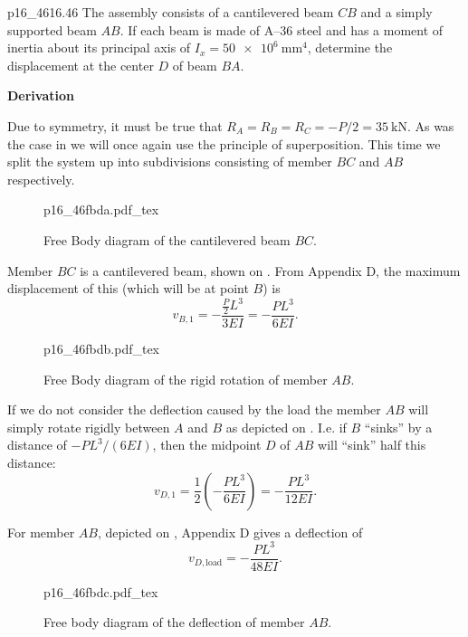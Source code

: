 \documentclass[a4paper]{article}
\newcommand{\incfig}[2][1]{%
  \def\svgwidth{#1\columnwidth}
  {#2.pdf_tex}
}
\newcounter{problem}
\numberwithin{equation}{problem}
\newcommand{\AUheading}[1]{%
  \par\vspace{.4\baselineskip}%
  {\sffamily\bfseries\color{AUblueDark}#1\par}%
  \nobreak%
}
\newenvironment{derivation}[1][Derivation]{%
  \AUheading{#1}
  \begingroup\allowdisplaybreaks
  \setlength{\abovedisplayskip}{6pt}%
  \setlength{\belowdisplayskip}{6pt}%
  \setlength{\abovedisplayshortskip}{4pt}%
  \setlength{\belowdisplayshortskip}{4pt}%
}{\par\endgroup\medskip}
\begin{document}
\begin{problemwithimage}{p16_46}{16.46}\label{pro:16-46}
  The assembly consists of a cantilevered beam $CB$ and a simply supported beam $AB$.
  If each beam is made of A--36 steel and has a moment of inertia about its principal axis of $I_x = \qty{50e6}{\mm^{4}}$, determine the displacement at the center $D$ of beam $BA$.
\end{problemwithimage}

\begin{derivation}
  Due to symmetry, it must be true that $R_A = R_B = R_C = - P / 2 = \qty{35}{\kN}$.
  As was the case in  we will once again use the principle of superposition.
  This time we split the system up into subdivisions consisting of member $BC$ and $AB$ respectively.

\begin{figure}[ht]
    \centering
    \incfig{p16_46fbda}
    \caption{Free Body diagram of the cantilevered beam $BC$.}
    \label{fig:p16_46fbda}
\end{figure}

  Member $BC$ is a cantilevered beam, shown on .
  From Appendix D, the maximum displacement of this (which will be at point $B$) is
  \begin{equation*}
    v_{B,1} = - \frac{\frac{P}{2} L^3}{3 EI} = - \frac{P L^3}{6EI}
  .\end{equation*}


\begin{figure}[ht]
    \centering
    \incfig[0.8]{p16_46fbdb}
    \caption{Free Body diagram of the rigid rotation of member $AB$.}
    \label{fig:p16_46fbdb}
\end{figure}
  If we do not consider the deflection caused by the load the member $AB$ will simply rotate rigidly between $A$ and $B$ as depicted on .
  I.e. if $B$ ``sinks'' by a distance of $- P L^3 / (6EI)$, then the midpoint $D$ of $AB$ will ``sink'' half this distance:
  \begin{equation*}
    v_{D,1} = \frac{1}{2} \left( - \frac{PL^3}{6EI} \right) = - \frac{PL^3}{12EI}
  .\end{equation*}

  For member $AB$, depicted on , Appendix D gives a deflection of
  \begin{equation*}
    v_{D, \text{load}} = - \frac{PL^3}{48 EI}
  .\end{equation*}

  \begin{figure}[ht]
    \centering
    \incfig[0.9]{p16_46fbdc}
    \caption{Free body diagram of the deflection of member $AB$.}
    \label{fig:p16_46fbdc}
  \end{figure}


\end{derivation}
\end{document}
